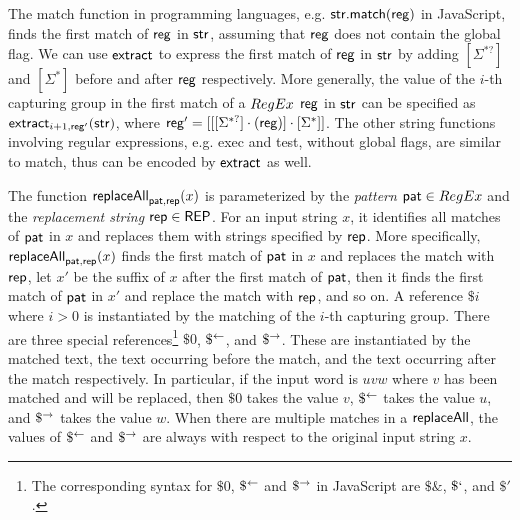 \begin{remark}
The match function in programming languages, e.g. $\sf str.match(reg)$ in JavaScript, finds the first match of $\sf reg$ in $\sf str$,  assuming that $\sf reg$ does not contain the global flag. We can use $\mathsf{extract}$ to express the first match of $\sf reg$ in $\sf str$ by adding $[\Sigma^{*?}]$ and $[\Sigma^*]$ before and after $\sf reg$ respectively. More generally, the value of the $i$-th capturing group in the first match of a ${RegEx}$ $\sf reg$ in $\sf str$ can be specified as $\mathsf{extract}_{i+1, {\sf reg'}}({\sf str})$, where ${\sf reg'} = [[[\Sigma^{*?}] \cdot ({\sf reg})] \cdot [\Sigma^*]]$. The other string functions involving regular expressions, e.g. {\sf exec} and {\sf test}, without global flags, are similar to {\sf match}, thus can be encoded by $\mathsf{extract}$ as well.
\end{remark}

The function $\mathsf{replaceAll}_{\mathsf{pat}, \mathsf{rep}}(x)$ is parameterized by the \emph{pattern} $\mathsf{pat} \in {RegEx}$ and the \emph{replacement string} $\mathsf{rep} \in {\sf REP}$.
For an input string $x$, it identifies all matches of $\mathsf{pat}$ in $x$ and replaces them with strings specified by $\mathsf{rep}$. More specifically, $\mathsf{replaceAll}_{\mathsf{pat}, \mathsf{rep}}(x)$ finds the first match of $\mathsf{pat}$ in $x$ and replaces the match with $\mathsf{rep}$, let $x'$ be the suffix of $x$ after the first match of $\mathsf{pat}$,  then it finds the first match of $\mathsf{pat}$ in $x'$ and replace the match with $\mathsf{rep}$, and so on.
%
A reference $\$i$ where $i > 0$ is instantiated by the matching of the $i$-th capturing group.
There are three special references\footnote{
    The corresponding syntax for $\$0$, $\$^{\leftarrow}$ and $\$^{\rightarrow}$ in JavaScript are $\$\&$, $\$`$, and $\$'$.
} $\$0$, $\$^{\leftarrow}$, and $\$^{\rightarrow}$.
These are instantiated by the matched text, the text occurring before the match, and the text occurring after the match respectively.
In particular, if the input word is $u v w$ where $v$ has been matched and will be replaced, then $\$0$ takes the value $v$, $\$^{\leftarrow}$ takes the value $u$, and $\$^{\rightarrow}$ takes the value $w$.
When there are multiple matches in a $\mathsf{replaceAll}$, the values of $\$^{\leftarrow}$ and $\$^{\rightarrow}$ are always with respect to the original input string $x$.

